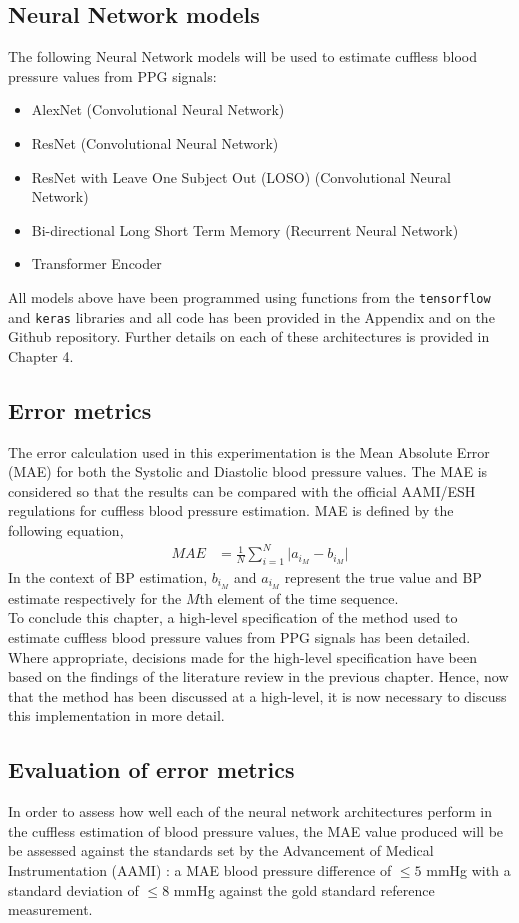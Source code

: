 \subsection{Neural Network models}
The following Neural Network models will be used to estimate cuffless blood pressure values from PPG signals:
\begin{itemize}
    \item AlexNet (Convolutional Neural Network)
    \item ResNet (Convolutional Neural Network)
    \item ResNet with Leave One Subject Out (LOSO) (Convolutional Neural Network)
    \item Bi-directional Long Short Term Memory (Recurrent Neural Network)
    \item Transformer Encoder
\end{itemize}\noindent All models above have been programmed using functions from the \texttt{tensorflow} and \texttt{keras} libraries and all 
code has been provided in the Appendix and on the Github repository. Further details on each of these architectures is provided in Chapter 4.


\subsection{Error metrics}
The error calculation used in this experimentation is the Mean Absolute Error 
(MAE) for both the Systolic and Diastolic blood pressure values. The MAE is considered so that the results can be compared with the official AAMI/ESH regulations for cuffless blood pressure estimation. MAE is defined by the following equation, 
\begin{align}
    MAE &= \frac{1}{N} \sum_{i=1}^N \lvert a_{i_{M}} - b_{i_{M}} \rvert
\end{align}\noindent In the context of BP estimation, $b_{i_{M}}$ and $a_{i_{M}}$ represent the true 
value and BP estimate respectively for the $M$th element of the time sequence.\\ \newline \noindent To conclude this chapter, a high-level specification of the method used to estimate cuffless blood pressure values from PPG signals has been detailed. 
Where appropriate, decisions made for the high-level specification have been based on the findings of the literature review in the 
previous chapter. Hence, now that the method has been discussed at a high-level, it is now necessary 
to discuss this implementation in more detail.

\subsection{Evaluation of error metrics}
In order to assess how well each of the neural network architectures perform in the cuffless estimation of blood pressure 
values, the MAE value produced will be be assessed against the standards set by the Advancement of Medical Instrumentation (AAMI) \cite{aami}: a MAE blood pressure difference of $\le 5$ mmHg with a standard deviation of $\le 8$ mmHg against 
the gold standard reference measurement.
